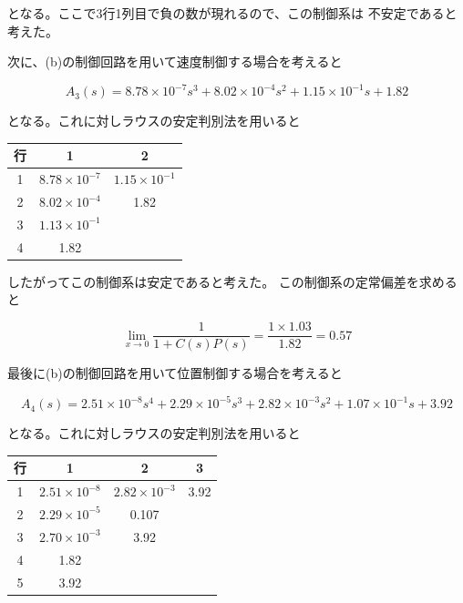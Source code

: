 \documentclass[uplatex, 11pt,a4j, titlepage]{jsarticle}
\begin{document}
となる。ここで3行1列目で負の数が現れるので、この制御系は
不安定であると考えた。

次に、(b)の制御回路を用いて速度制御する場合を考えると

\begin{equation}
    A_3(s) = 8.78\times10^{-7}s^3 + 8.02\times10^{-4}s^2 
        + 1.15\times10^{-1}s + 1.82
\end{equation}

となる。これに対しラウスの安定判別法を用いると

\begin{table}[h]
    \centering
    \begin{tabular}{|c||c|c|} \hline
        行 & 1 & 2 \\ \hline \hline
        1 & $8.78\times10^{-7}$ & $1.15\times10^{-1}$ \\ \hline
        2 & $8.02\times10^{-4}$ & 1.82 \\ \hline
        3 & $1.13\times10^{-1}$ & \  \\ \hline
        4 & 1.82 & \  \\ \hline
    \end{tabular}
\end{table}

したがってこの制御系は安定であると考えた。
この制御系の定常偏差を求めると

\begin{equation}
    \lim_{x \to 0}\frac{1}{1+C(s)P(s)} 
        = \frac{1\times1.03}{1.82} = 0.57 
\end{equation}

最後に(b)の制御回路を用いて位置制御する場合を考えると

\begin{equation}
    A_4(s) = 2.51\times10^{-8} s^4 + 2.29\times10^{-5}s^3 
        + 2.82\times10^{-3}s^2 
        + 1.07\times10^{-1}s + 3.92
\end{equation}

となる。これに対しラウスの安定判別法を用いると

\begin{table}[h]
    \centering
    \begin{tabular}{|c||c|c|c|} \hline
        行 & 1 & 2 & 3 \\ \hline \hline
        1 & $2.51\times10^{-8}$ & $2.82\times10^{-3}$ & 3.92 \\ \hline
        2 & $2.29\times10^{-5}$ & 0.107 & \  \\ \hline
        3 & $2.70\times10^{-3}$ & 3.92 & \  \\ \hline
        4 & 1.82 & \ & \  \\ \hline
        5 & 3.92 & \ & \ \\ \hline
    \end{tabular}
\end{table}
\end{document}
